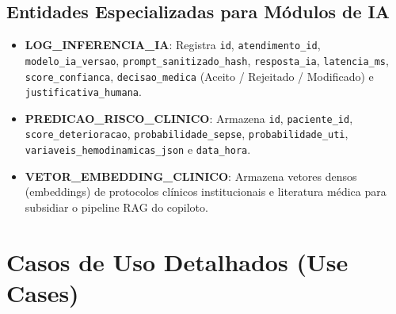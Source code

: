 \documentclass[12pt,oneside,a4paper,article]{abntex2}
\begin{document}
\subsection{Entidades Especializadas para Módulos de IA}
\begin{itemize}[noitemsep]
  \item \textbf{LOG\_INFERENCIA\_IA}: Registra \texttt{id}, \texttt{atendimento\_id}, \texttt{modelo\_ia\_versao}, \texttt{prompt\_sanitizado\_hash}, \texttt{resposta\_ia}, \texttt{latencia\_ms}, \texttt{score\_confianca}, \texttt{decisao\_medica} (Aceito / Rejeitado / Modificado) e \texttt{justificativa\_humana}.
  \item \textbf{PREDICAO\_RISCO\_CLINICO}: Armazena \texttt{id}, \texttt{paciente\_id}, \texttt{score\_deterioracao}, \texttt{probabilidade\_sepse}, \texttt{probabilidade\_uti}, \texttt{variaveis\_hemodinamicas\_json} e \texttt{data\_hora}.
  \item \textbf{VETOR\_EMBEDDING\_CLINICO}: Armazena vetores densos (embeddings) de protocolos clínicos institucionais e literatura médica para subsidiar o pipeline RAG do copiloto.
\end{itemize}
\section{Casos de Uso Detalhados (Use Cases)}
\end{document}
